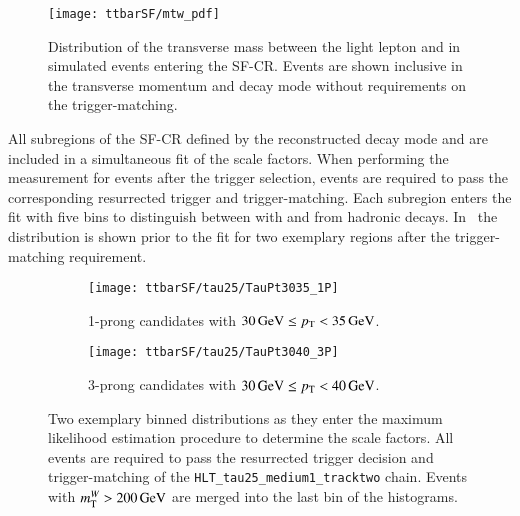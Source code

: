 
\begin{figure}[htbp]
  \centering

  \texttt{[image: ttbarSF/mtw\_pdf]}

  \caption{Distribution of the transverse mass between the light
    lepton and \pTmiss in simulated \ttbar events entering the
    SF-CR. Events are shown inclusive in the \tauhadvis transverse
    momentum and decay mode without requirements on the
    trigger-matching.}%
  \label{fig:ttbarsf_mtw_pdf}

\end{figure}

All subregions of the SF-CR defined by the reconstructed \tauhadvis
decay mode and \pT are included in a simultaneous fit of the scale
factors. When performing the measurement for events after the
\tauhadvis trigger selection, events are required to pass the
corresponding resurrected trigger and trigger-matching. Each subregion
enters the fit with five \mTW bins to distinguish between \ttbar with
\faketauhadvis and \tauhadvis from hadronic \taulepton
decays. In~ the \mTW
distribution is shown prior to the fit for two exemplary regions after
the trigger-matching requirement.


\begin{figure}[htbp]
  \centering

  \begin{subfigure}{.485\textwidth}
    \texttt{[image: ttbarSF/tau25/TauPt3035\_1P]}
    \caption{1-prong \tauhadvis candidates with
      $\SI{30}{\ensuremath{\text{GeV}}} \leq p_{\text{T}} < \SI{35}{\ensuremath{\text{GeV}}}$.}
  \end{subfigure}\hfill%
  \begin{subfigure}{.485\textwidth}
    \texttt{[image: ttbarSF/tau25/TauPt3040\_3P]}
    \caption{3-prong \tauhadvis candidates with
      $\SI{30}{\GeV} \leq \pT < \SI{40}{\GeV}$.}
  \end{subfigure}

  \caption{Two exemplary binned \mTW distributions as they enter the
    maximum likelihood estimation procedure to determine the
    \faketauhadvis scale factors. All events are required to pass the
    resurrected trigger decision and trigger-matching of the
    \texttt{HLT\_tau25\_medium1\_tracktwo} chain. Events with
    $m_{\text{T}}^W > \SI{200}{\ensuremath{\text{GeV}}}$ are merged into the last bin of the
    histograms.}%
  \label{fig:ttbarsf_mtw_examples_prefit}
\end{figure}

